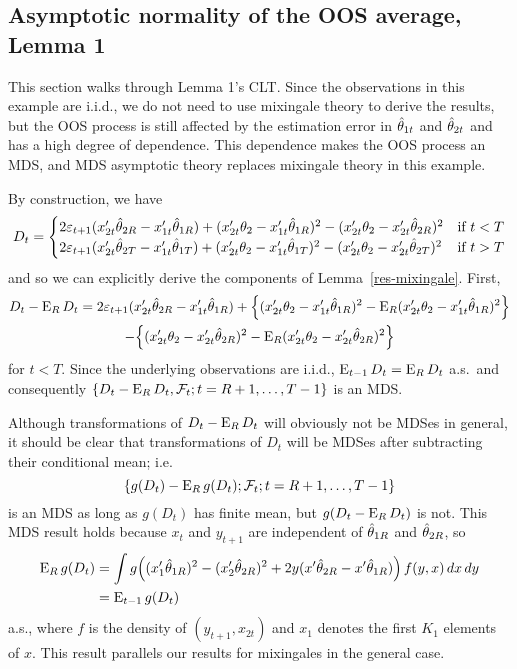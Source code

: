 \subsection{Asymptotic normality of the OOS average, Lemma 1}

This section walks through Lemma 1's CLT. Since the observations in
this example are i.i.d., we do not need to use mixingale theory to
derive the results, but the OOS process is still affected by the
estimation error in $\hat\theta_{1t}$ and $\hat\theta_{2t}$ and has a high degree of
dependence. This dependence makes the OOS process an MDS, and MDS
asymptotic theory replaces mixingale theory in this example.

By construction, we have
\begin{equation*}
  D_t =
  \begin{cases}
    2 \varepsilon_{t+1} (x_{2t}'\hat\theta_{2R} - x_{1t}'\hat\theta_{1R})
    + (x_{2t}'\theta_2 - x_{1t}'\hat\theta_{1R})^2
    - (x_{2t}'\theta_2 - x_{2t}'\hat\theta_{2R})^2
    & \text{if } t < T \\
    2 \varepsilon_{t+1} (x_{2t}'\hat\theta_{2T} - x_{1t}'\hat\theta_{1T})
    + (x_{2t}'\theta_2 - x_{1t}'\hat\theta_{1T})^2
    - (x_{2t}'\theta_2 - x_{2t}'\hat\theta_{2T})^2
    & \text{if } t > T
  \end{cases}
\end{equation*}
and so we can explicitly derive the components of
Lemma~\ref{res-mixingale}. First,
\begin{multline*}
  D_t - \operatorname{E}_R D_t
  = 2 \varepsilon_{t+1} (x_{2t}'\hat\theta_{2R} - x_{1t}'\hat\theta_{1R})
  + \Big\{(x_{2t}'\theta_2 - x_{1t}'\hat\theta_{1R})^2
          - \operatorname{E}_R (x_{2t}'\theta_2 - x_{1t}'\hat\theta_{1R})^2 \Big\} \\
  - \Big\{(x_{2t}'\theta_2 - x_{2t}'\hat\theta_{2R})^2
          - \operatorname{E}_R (x_{2t}'\theta_2 - x_{2t}'\hat\theta_{2R})^2 \Big\}
\end{multline*}
for $t < T$. Since the underlying observations are i.i.d., $\operatorname{E}_{t-1}
D_t = \operatorname{E}_R D_t$ a.s.\ and consequently $\{D_t - \operatorname{E}_R D_t, \mathcal{F}_{t};
t=R+1,\dots,T-1\}$ is an MDS.

Although transformations of $D_t - \operatorname{E}_R D_t$ will obviously not be
MDSes in general, it should be clear that transformations of $D_t$
will be MDSes after subtracting their conditional mean; i.e.
\begin{equation*}
  \{g(D_t) - \operatorname{E}_R g(D_t); \mathcal{F}_t; t = R+1,\dots,T-1\}
\end{equation*}
is an MDS as long as
$g(D_t)$ has finite mean, but $g(D_t - \operatorname{E}_R D_t)$ is not. This MDS
result holds because $x_t$ and $y_{t+1}$ are independent of $\hat\theta_{1R}$
and $\hat\theta_{2R}$, so
\begin{equation*}\begin{split}
  \operatorname{E}_R g(D_t)
  &= \int g\Big((x_1'\hat\theta_{1R})^2 - (x_2'\hat\theta_{2R})^2
       + 2 y (x'\hat\theta_{2R} - x'\hat\theta_{1R})\Big) \, f(y, x) \, dx \, dy \\
  &= \operatorname{E}_{t-1} g(D_t)
\end{split}\end{equation*}
a.s., where $f$ is the density of $(y_{t+1}, x_{2t})$ and $x_1$
denotes the first $K_1$ elements of $x$. This result parallels our
results for mixingales in the general case.

